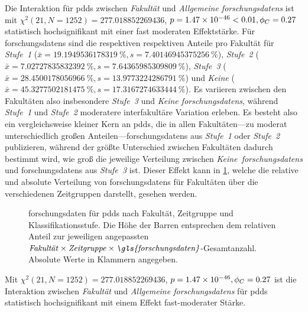 Die Interaktion für \glspl{pdd} zwischen \textit{Fakultät} und \textit{Allgemeine \glspl{forschungsdaten}} ist mit $\chi^2 (\num{21}, N = \num{1252}) = \num[round-mode=places,round-precision=2]{277.018852269436}$, $p = \num[round-mode=places,round-precision=2]{1.46707274481795E-46}<\num{0.01},\phi_C=\num[round-mode=places,round-precision=2]{0.271576302422829}$ statistisch hochsignifikant mit einer fast moderaten Effektstärke.
Für \glspl{forschungsdaten} sind die respektiven respektiven Anteile pro Fakultät für \textit{Stufe~1} ($\bar{x}=\SI[round-mode=places,round-precision=2]{19.1949536178319}{\percent},s=\SI[round-mode=places,round-precision=2]{7.40146945375256}{\percent}$), \textit{Stufe~2} ($\bar{x}=\SI[round-mode=places,round-precision=2]{7.02727835832392}{\percent},s=\SI[round-mode=places,round-precision=2]{7.64365985309809}{\percent}$), \textit{Stufe~3} ($\bar{x}=\SI[round-mode=places,round-precision=2]{28.4500178056966}{\percent},s=\SI[round-mode=places,round-precision=2]{13.9773224286791}{\percent}$) und \textit{Keine} ($\bar{x}=\SI[round-mode=places,round-precision=2]{45.3277502181475}{\percent},s=\SI[round-mode=places,round-precision=2]{17.3167274633444}{\percent}$).
Es variieren zwischen den Fakultäten also insbesondere \textit{Stufe~3} und \textit{Keine \glspl{forschungsdaten}}, während \textit{Stufe~1} und \textit{Stufe~2} moderatere interfakultäre Variation erleben.
Es besteht also ein vergleichsweise kleiner Kern an \glspl{pdd}, die in allen Fakultäten---zu moderat unterschiedlich großen Anteilen---\glspl{forschungsdaten} aus \textit{Stufe~1} oder \textit{Stufe~2} publizieren, während der größte Unterschied zwischen Fakultäten dadurch bestimmt wird, wie groß die jeweilige Verteilung zwischen \textit{Keine~\glspl{forschungsdaten}} und \glspl{forschungsdaten} aus \textit{Stufe~3} ist.
Dieser Effekt kann in \cref{fig:luh-repo_fakultät_x_zeitgruppe_x_fd}, welche die relative und absolute Verteilung von \glspl{forschungsdaten} für Fakultäten über die verschiedenen Zeitgruppen darstellt, gesehen werden.
\begin{figure}[!htbp]
    \resizebox{\ifdim\width>\textwidth\textwidth\else\width\fi}{!}{}
    \caption{\gls{forschungsdaten} für \glspl{pdd} nach Fakultät, Zeitgruppe und Klassifikationsstufe.
    Die Höhe der Barren entsprechen dem relativen Anteil zur jeweiligen angepassten $\text{\textit{Fakultät}}\times\text{\textit{Zeitgruppe}}\times\text{\textit{\gls{forschungsdaten}}}$-Gesamtanzahl.
    Absolute Werte in Klammern angegeben.}
    \label{fig:luh-repo_fakultät_x_zeitgruppe_x_fd}
\end{figure}
Mit $\chi^2 (\num{21}, N = \num{1252}) = \num[round-mode=places,round-precision=2]{277.018852269436}$, $p = \num[round-mode=places,round-precision=2]{1.46707274481795E-46},\phi_C=\num[round-mode=places,round-precision=2]{0.271576302422829}$ ist die Interaktion zwischen \textit{Fakultät} und \textit{Allgemeine \glspl{forschungsdaten}} für \glspl{pdd} statistisch hochsignifikant mit einem Effekt fast-moderater Stärke.

